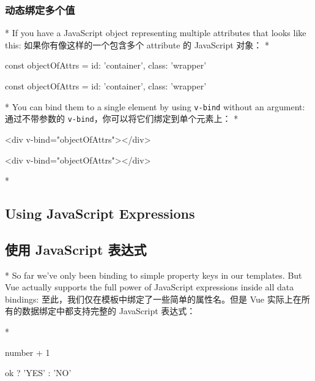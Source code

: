 \begin{paracol}{2}
\subsubsection{动态绑定多个值}
\switchcolumn[0]*%
If you have a JavaScript object representing multiple attributes that
looks like this:
\switchcolumn
如果你有像这样的一个包含多个 attribute 的 JavaScript 对象：
\switchcolumn[0]*%
\begin{codeJs}
const objectOfAttrs = {
  id: 'container',
  class: 'wrapper'
}
\end{codeJs}
\switchcolumn
\begin{codeJs}
const objectOfAttrs = {
  id: 'container',
  class: 'wrapper'
}
\end{codeJs}
\switchcolumn[0]*%
You can bind them to a single element by using \texttt{v-bind} without
an argument:
\switchcolumn
通过不带参数的 \texttt{v-bind}，你可以将它们绑定到单个元素上：
\switchcolumn[0]*%
\begin{codeHtml}
<div v-bind="objectOfAttrs"></div>
\end{codeHtml}  
\switchcolumn
\begin{codeHtml}
<div v-bind="objectOfAttrs"></div>
\end{codeHtml}  
\switchcolumn[0]*%
\subsection{Using JavaScript Expressions}
\switchcolumn
\subsection{使用 JavaScript 表达式}
\switchcolumn[0]*%
So far we've only been binding to simple property keys in our templates.
But Vue actually supports the full power of JavaScript expressions
inside all data bindings:
\switchcolumn
至此，我们仅在模板中绑定了一些简单的属性名。但是 Vue
实际上在所有的数据绑定中都支持完整的 JavaScript 表达式：

\switchcolumn[0]*%
\switchcolumn
\begin{codeHtml}
{{ number + 1 }}

{{ ok ? 'YES' : 'NO' }}


\end{codeHtml}
\end{paracol}
